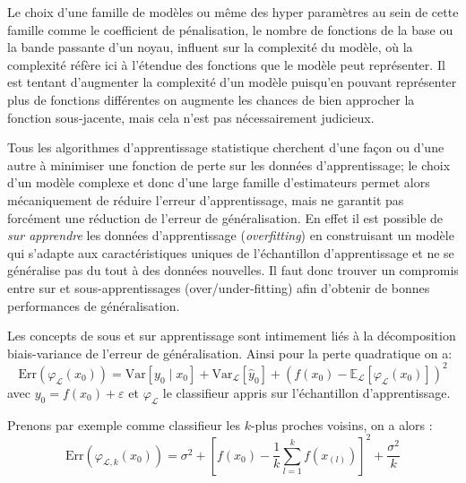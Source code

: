 Le choix d'une famille de modèles ou même des hyper paramètres au sein de cette famille comme le coefficient de pénalisation, le nombre de fonctions de la base ou la bande passante d'un noyau, influent sur la complexité du modèle, où la complexité réfère ici à l'étendue des fonctions que le modèle peut représenter. Il est tentant d'augmenter la complexité d'un modèle puisqu'en pouvant représenter plus de fonctions différentes on augmente les chances de bien approcher la fonction sous-jacente, mais cela n'est pas nécessairement judicieux.

Tous les algorithmes d'apprentissage statistique cherchent d'une façon ou d'une autre à minimiser une fonction de perte sur les données d'apprentissage; le choix d'un modèle complexe et donc d'une large famille d'estimateurs permet alors mécaniquement de réduire l'erreur d'apprentissage, mais ne garantit pas forcément une réduction de l'erreur de généralisation. En effet il est possible de \emph{sur apprendre} les données d'apprentissage (\emph{overfitting}) en construisant un modèle qui s'adapte aux caractéristiques uniques de l'échantillon d'apprentissage et ne se généralise pas du tout à des données nouvelles. Il faut donc trouver un compromis entre sur et sous-apprentissages (over/under-fitting) afin d'obtenir de bonnes performances de généralisation.


Les concepts de sous et sur apprentissage sont intimement liés à la décomposition biais-variance de l'erreur de généralisation. Ainsi pour la perte quadratique on a:
\begin{equation*}
    \mathrm{Err} \left(\varphi_{\mathcal{L}} (x_0) \right) = \mathrm{Var} [y_0 \mid x_0 ] + \mathrm{Var}_{\mathcal{L}} [\hat{y}_0] + \left( f (x_0) − \mathbb{E}_{\mathcal{L}} \left[ \varphi_{\mathcal{L}} (x_0) \right] \right)^2
\end{equation*}
avec $y_0 = f (x_0) + \varepsilon$ et $\varphi_{\mathcal{L}}$ le classifieur appris sur l'échantillon d'apprentissage.

Prenons par exemple comme classifieur les $k$-plus proches voisins, on a alors \citep{Trevor}:
\begin{equation*}
    \mathrm{Err} \left( \varphi_{\mathcal{L},k} (x_0) \right) = \sigma^2 + \left[ f(x_0) - \frac{1}{k} \sum_{l=1}^k f(x_{(l)}) \right]^2 + \frac{\sigma^2}{k}
\end{equation*}

